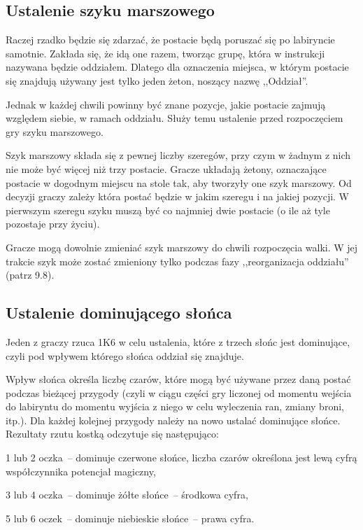 \subsection{Ustalenie szyku marszowego}

Raczej rzadko będzie się zdarzać, że postacie będą poruszać się po labiryncie samotnie.
Zakłada się, że idą one razem, tworząc grupę, która w instrukcji nazywana będzie oddziałem.
Dlatego dla oznaczenia miejsca, w którym postacie się znajdują używany jest tylko jeden żeton, noszący nazwę ,,Oddział''.

Jednak w każdej chwili powinny być znane pozycje, jakie postacie zajmują względem siebie, w ramach oddziału.
Służy temu ustalenie przed rozpoczęciem gry szyku marszowego.

Szyk marszowy składa się z pewnej liczby szeregów, przy czym w żadnym z nich nie może być więcej niż trzy postacie.
Gracze układają żetony, oznaczające postacie w dogodnym miejscu na stole tak, aby tworzyły one szyk marszowy.
Od decyzji graczy zależy która postać będzie w jakim szeregu i na jakiej pozycji.
W pierwszym szeregu szyku muszą być co najmniej dwie postacie (o ile aż tyle pozostaje przy życiu).

Gracze mogą dowolnie zmieniać szyk marszowy do chwili rozpoczęcia walki.
W jej trakcie szyk może zostać zmieniony tylko podczas fazy ,,reorganizacja oddziału'' (patrz 9.8).

\subsection{Ustalenie dominującego słońca}

Jeden z graczy rzuca 1K6 w celu ustalenia, które z trzech słońc jest dominujące, czyli pod wpływem którego słońca oddział się znajduje.

Wpływ słońca określa liczbę czarów, które mogą być używane przez daną postać podczas bieżącej przygody (czyli w ciągu części gry liczonej od momentu wejścia do labiryntu do momentu wyjścia z niego w celu wyleczenia ran, zmiany broni, itp.).
Dla każdej kolejnej przygody należy na nowo ustalać dominujące słońce.
Rezultaty rzutu kostką odczytuje się następująco:

1 lub 2 oczka~-- dominuje czerwone słońce, liczba czarów określona jest lewą cyfrą współczynnika potencjał magiczny,

3 lub 4 oczka~-- dominuje żółte słońce~-- środkowa cyfra,

5 lub 6 oczek~-- dominuje niebieskie słońce~-- prawa cyfra.

